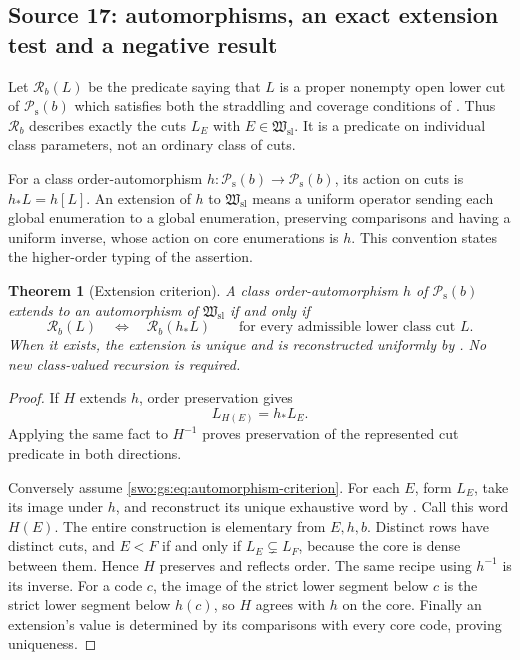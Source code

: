 \documentclass[11pt]{article}
\newtheorem{theorem}{Theorem}[section]
\theoremstyle{definition}
\theoremstyle{remark}
\newcommand{\Hsl}{\mathfrak W_{\mathrm{sl}}}
\newcommand{\Psupp}{\mathcal P_{\mathrm{s}}}
\begin{document}
\subsection{Source 17: automorphisms, an exact extension test and a negative result}
\label{swo:gs:sec:automorphisms}

Let $\mathscr R_b(L)$ be the predicate saying that $L$ is a proper nonempty
open lower cut of $\Psupp(b)$ which satisfies both the straddling and coverage
conditions of . Thus $\mathscr R_b$ describes
exactly the cuts $L_E$ with $E\in \Hsl$. It is a predicate on individual
class parameters, not an ordinary class of cuts.

For a class order-automorphism $h:\Psupp(b)\to \Psupp(b)$, its action on cuts is
$h_*L=h[L]$. An extension of $h$ to $\Hsl$ means a uniform operator sending
each global enumeration to a global enumeration, preserving comparisons
and having a uniform inverse, whose action on core enumerations is $h$.
This convention states the higher-order typing of the assertion.

\begin{theorem}[Extension criterion]\label{swo:gs:thm:extension-criterion}
A class order-automorphism $h$ of $\Psupp(b)$ extends to an automorphism of
$\Hsl$ if and only if
\[\tag{S17.9}\label{swo:gs:eq:automorphism-criterion}
 \mathscr R_b(L)\quad\Longleftrightarrow\quad\mathscr R_b(h_*L)
 \qquad\text{for every admissible lower class cut }L.
\]
When it exists, the extension is unique and is reconstructed uniformly by
. No new class-valued recursion is required.
\end{theorem}
\begin{proof}
If $H$ extends $h$, order preservation gives
\[
 L_{H(E)}=h_*L_E.
\]
Applying the same fact to $H^{-1}$ proves preservation of the represented
cut predicate in both directions.

Conversely assume \eqref{swo:gs:eq:automorphism-criterion}. For each $E$, form
$L_E$, take its image under $h$, and reconstruct its unique exhaustive
word by . Call this word $H(E)$. The entire
construction is elementary from $E,h,b$. Distinct rows have distinct cuts,
and $E<F$ if and only if $L_E\subsetneq L_F$, because the core is dense
between them. Hence $H$ preserves and reflects order. The same recipe
using $h^{-1}$ is its inverse. For a code $c$, the image of the strict
lower segment below $c$ is the strict lower segment below $h(c)$, so $H$
agrees with $h$ on the core. Finally an extension's value is determined
by its comparisons with every core code, proving uniqueness.
\end{proof}
\end{document}
